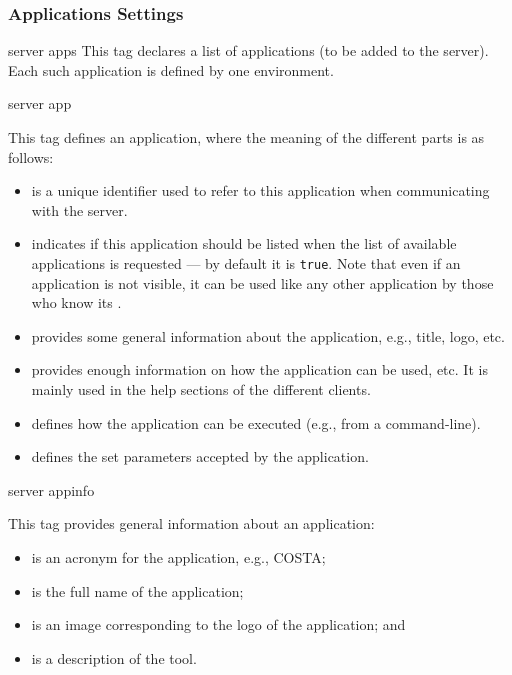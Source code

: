 \subsubsection*{Applications Settings}

\bigskip
\xmlstruct
{server}
{apps}
{%
%
  This tag declares a list of applications (to be added to the
  server). Each such application is defined by one 
  environment.  
%
} 


\bigskip
\xmlstruct
{server}
{app}
{%
%
  This tag defines an application, where the meaning of the different
  parts is as follows:
%
  \begin{itemize}

  \item {} is a unique identifier used to refer to
    this application when communicating with the server.

  \item {} indicates if this application should
    be listed when the list of available applications is requested ---
    by default it is \texttt{true}. 
    Note that even if an application is not visible, it can be used
    like any other application by those who know its
    .

  \item {} provides some general information about
    the application, e.g., title, logo, etc.

  \item {} provides enough information on how the
    application can be used, etc. It is mainly used in the help
    sections of the different clients.

  \item {} defines how the application can be
    executed (e.g., from a command-line).

  \item {} defines the set parameters accepted
    by the application.

  \end{itemize}
%
}



\bigskip
\xmlstruct
{server}
{appinfo}
{%
%
  This tag provides general information about an application:
%
  \begin{itemize}
  \item {} is an acronym for the application,
    e.g., COSTA;
  \item {} is the full name of the application;
  \item {} is an image corresponding to the logo of
    the application; and
  \item {} is a description of the tool.
  \end{itemize}
%
}



